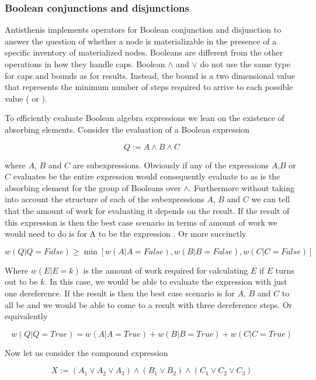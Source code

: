 \subsubsection{Boolean conjunctions and disjunctions}

Antisthenis implements operators for Boolean conjunction and
disjunction to answer the question of whether a node is materializable
in the presence of a specific inventory of materialized
nodes. Booleans are different from the other operations in how they
handle caps. Boolean \(\land\) and \(\lor\) do not use the same type
for caps and bounds as for results. Instead, the bound is a two
dimensional value that represents the minimum number of steps required
to arrive to each possible value ( or ).

To efficiently evaluate Boolean algebra expressions we lean on the
existence of absorbing elements. Consider the evaluation of a Boolean
expression

\[
Q := A \land B \land C
\]

where \(A\), \(B\) and \(C\) are subexpressions. Obviously if any of
the expressions \(A\),\(B\) or \(C\) evaluates be  the
entire expression would consequently evaluate to  as
 is the absorbing element for the group of Booleans over
\(\land\). Furthermore without taking into account the structure of
each of the subexpressions \(A\), \(B\) and \(C\) we can tell that the
amount of work for evaluating it depends on the result. If the result
of this expression is  then the best case scenario in
terms of amount of work we would need to do is for A to be the
expression . Or more succinctly

\[
w(Q|Q=\mathit{False}) \ge \min [w(A | A = \mathit{False}), w(B | B = \mathit{False}), w(C | C = \mathit{False})]
\]

Where \(w(E|E=k)\) is the amount of work required for calculating \(E\) if
\(E\) turns out to be \(k\). In this case, we would be able to evaluate
the expression with just one dereference. If the result is 
then the best case scenario is for \(A\), \(B\) and \(C\) to all be
 and we would be able to come to a result with three
dereference steps. Or equivalently

\[
w(Q|Q=\mathit{True}) = w(A | A = \mathit{True}) + w(B | B = \mathit{True}) + w(C | C = \mathit{True})
\]

Now let us consider the compound expression

\[
X := (A_1 \lor A_2 \lor A_3) \land (B_1 \lor B_2) \land (C_1 \lor C_2 \lor C_3)
\]

